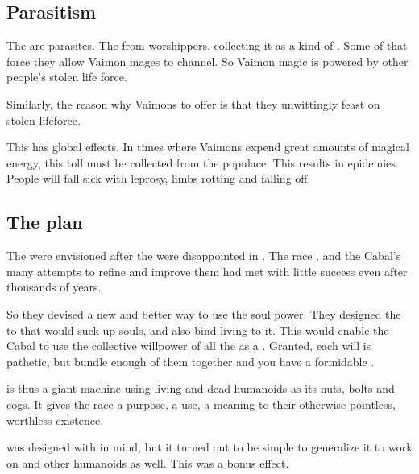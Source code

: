 \subsection{Parasitism}
The \Archons{} are parasites. 
The \sephiroth{}  from worshippers, collecting it as a kind of . 
Some of that force they allow Vaimon mages to channel. 
So Vaimon magic is powered by other people's stolen life force. 

Similarly, the reason why Vaimons  to offer is that they unwittingly feast on stolen lifeforce. 

This has global effects. 
In times where Vaimons expend great amounts of magical energy, this toll must be collected from the populace. 
This results in epidemies. 
People will fall sick with leprosy, limbs rotting and falling off. 









\subsection{The \Iquin plan}
The \sephiroth{} were envisioned after the  were disappointed in \humans. 
The \human{} race , and the Cabal's many attempts to refine and improve them had met with little success even after thousands of years. 

So they devised a new and better way to use the \pps{\humans} soul power. 
They designed the \sephiroth{} to  that would suck up \human{} souls, and also bind living \humans{} to it. 
This would enable the Cabal to use the collective willpower of all the \humans{} as a \vertex. 
Granted, each \human{} will is pathetic, but bundle enough of them together and you have a formidable \vertex. 

\Iquin{} is thus a giant machine using living and dead humanoids as its nuts, bolts and cogs. 
It gives the \human{} race a purpose, a use, a meaning to their otherwise pointless, worthless existence. 

\Iquin{} was designed with \humans{} in mind, but it turned out to be simple to generalize it to work on \scathae{} and other humanoids as well. 
This was a bonus effect. 





